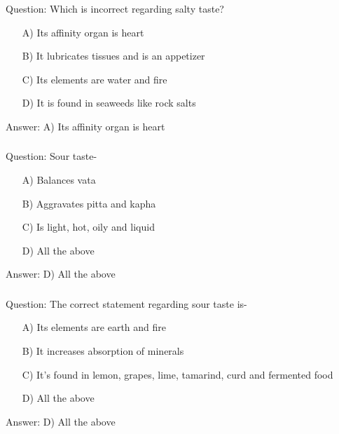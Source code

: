 \begin{frame}[fragile]\frametitle{}

Question: Which is incorrect regarding salty taste?

\begin{itemize}
\item[A)] Its affinity organ is heart
\item[B)] It lubricates tissues and is an appetizer
\item[C)] Its elements are water and fire
\item[D)] It is found in seaweeds like rock salts
\end{itemize}

Answer: A) Its affinity organ is heart
\end{frame}

\begin{frame}[fragile]\frametitle{}

Question: Sour taste-

\begin{itemize}
\item[A)] Balances vata
\item[B)] Aggravates pitta and kapha
\item[C)] Is light, hot, oily and liquid
\item[D)] All the above
\end{itemize}

Answer: D) All the above
\end{frame}

\begin{frame}[fragile]\frametitle{}

Question: The correct statement regarding sour taste is-

\begin{itemize}
\item[A)] Its elements are earth and fire
\item[B)] It increases absorption of minerals
\item[C)] It's found in lemon, grapes, lime, tamarind, curd and fermented food
\item[D)] All the above
\end{itemize}

Answer: D) All the above
\end{frame}

